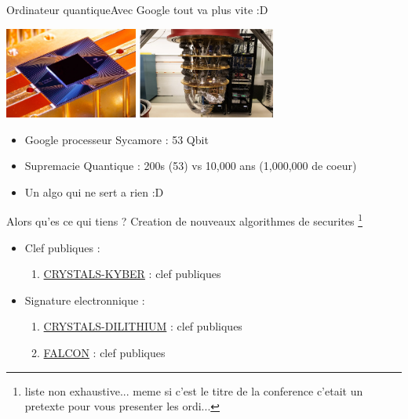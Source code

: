 \documentclass{beamer}
\begin{document}
\begin{frame}{Ordinateur quantique}{Avec Google tout va plus vite :D }
  \begin{center}
    \includegraphics[height=3cm]{sycamore1.jpeg}
    \includegraphics[height=3cm]{sycamore2.png}
  \end{center}
  \begin{itemize}
  \item Google processeur Sycamore : 53 Qbit
  \item Supremacie Quantique : 200s (53) vs 10,000 ans (1,000,000 de coeur)
  \item Un algo qui ne sert a rien :D
  \end{itemize}
\end{frame}

\begin{frame}{Alors qu'es ce qui tiens ?}
  Creation de nouveaux algorithmes de securites \footnote{liste non exhaustive... meme si c'est le titre de la conference c'etait un pretexte pour vous presenter les ordi...}
  \begin{itemize}
    \item Clef publiques :
      \begin{enumerate}
      \item \href{https://pq-crystals.org/}{CRYSTALS-KYBER} : clef publiques
      \end{enumerate}
    \item Signature electronnique :
      \begin{enumerate}
      \item \href{https://pq-crystals.org/}{CRYSTALS-DILITHIUM} : clef publiques
      \item \href{https://pq-crystals.org/}{FALCON} : clef publiques
      \end{enumerate}
  \end{itemize}
\end{frame}
\end{document}
